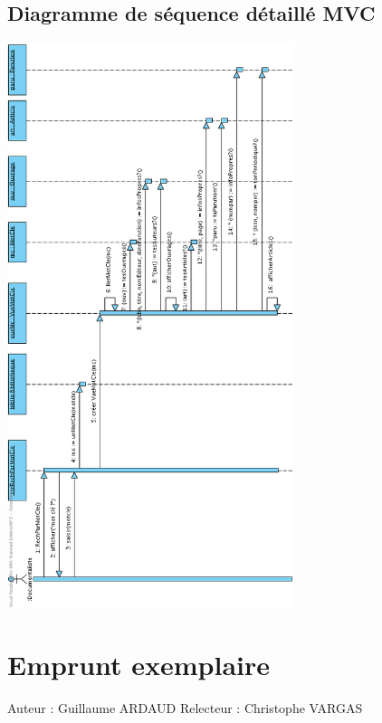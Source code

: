 \documentclass[a4paper,10pt]{report}
\begin{document}
\section*{Diagramme de séquence détaillé MVC}
\bigskip
\includegraphics[height=165mm]{RechParMotCleMVC.png}

\newpage


\chapter*{Emprunt exemplaire}

Auteur : Guillaume ARDAUD
Relecteur : Christophe VARGAS
\end{document}
